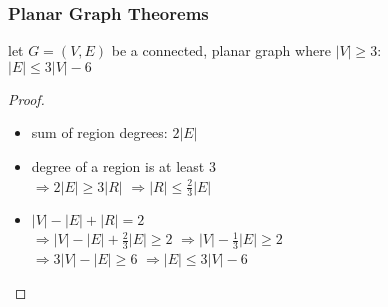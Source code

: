 \documentclass[dvipsnames]{beamer}
\begin{document}
%

\begin{frame}
  \frametitle{Planar Graph Theorems}

  \begin{theorem}
    let $G=(V,E)$ be a connected, planar graph where $|V| \geq 3$:\\
    $|E| \leq 3 |V| - 6$
  \end{theorem}

  \pause
  \begin{proof}
    \begin{itemize}
      \item sum of region degrees: $2 |E|$

      \pause
      \item degree of a region is at least $3$\\
        \pause
        $\Rightarrow 2 |E| \geq 3 |R|$
        \pause
        $\Rightarrow |R| \leq \frac{2}{3} |E|$

      \pause
      \item $|V| - |E| + |R| = 2$\\
        \pause
        $\Rightarrow |V| - |E| + \frac{2}{3} |E| \geq 2$
        \pause
        $\Rightarrow |V| - \frac{1}{3} |E| \geq 2$\\
        \pause
        $\Rightarrow 3 |V| - |E| \geq 6$
        \pause
        $\Rightarrow |E| \leq 3 |V| - 6$\\
    \end{itemize}
  \end{proof}
\end{frame}
\end{document}
